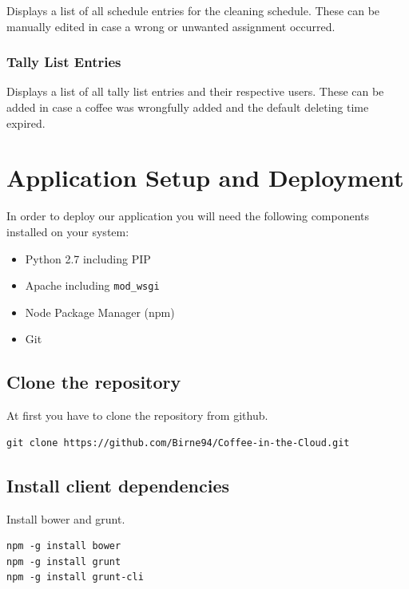 Displays a list of all schedule entries for the cleaning schedule. These
can be manually edited in case a wrong or unwanted assignment occurred.

\subsubsection{Tally List Entries}\label{tally-list-entries}

Displays a list of all tally list entries and their respective users.
These can be added in case a coffee was wrongfully added and the default
deleting time expired.

\newpage
\section{Application Setup and
Deployment}\label{application-setup-and-deployment}

In order to deploy our application you will need the following
components installed on your system:

\begin{itemize}
\item
  Python 2.7 including PIP
\item
  Apache including \texttt{mod\_wsgi}
\item
  Node Package Manager (npm)
\item
  Git
\end{itemize}

\subsection{Clone the repository}\label{clone-the-repository}

At first you have to clone the repository from github.

\begin{verbatim}
git clone https://github.com/Birne94/Coffee-in-the-Cloud.git
\end{verbatim}

\subsection{Install client
dependencies}\label{install-client-dependencies}

Install bower and grunt.

\begin{verbatim}
npm -g install bower
npm -g install grunt
npm -g install grunt-cli
\end{verbatim}

